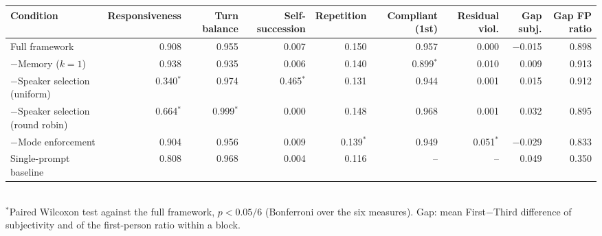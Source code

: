 \begin{tabular}{lrrrrrrrr}
\toprule
Condition & Responsiveness & Turn balance & Self-succession & Repetition & Compliant (1st) & Residual viol. & Gap subj. & Gap FP ratio \\
\midrule
Full framework & 0.908 & 0.955 & 0.007 & 0.150 & 0.957 & 0.000 & $-$0.015 & 0.898 \\
$-$Memory ($k=1$) & 0.938 & 0.935 & 0.006 & 0.140 & 0.899$^{*}$ & 0.010 & 0.009 & 0.913 \\
$-$Speaker selection (uniform) & 0.340$^{*}$ & 0.974 & 0.465$^{*}$ & 0.131 & 0.944 & 0.001 & 0.015 & 0.912 \\
$-$Speaker selection (round robin) & 0.664$^{*}$ & 0.999$^{*}$ & 0.000 & 0.148 & 0.968 & 0.001 & 0.032 & 0.895 \\
$-$Mode enforcement & 0.904 & 0.956 & 0.009 & 0.139$^{*}$ & 0.949 & 0.051$^{*}$ & $-$0.029 & 0.833 \\
Single-prompt baseline & 0.808 & 0.968 & 0.004 & 0.116 & -- & -- & 0.049 & 0.350 \\
\bottomrule
\end{tabular}
\\[2pt]
{\footnotesize $^{*}$Paired Wilcoxon test against the full framework, $p<0.05/6$ (Bonferroni over the six measures). Gap: mean First$-$Third difference of subjectivity and of the first-person ratio within a block.}
